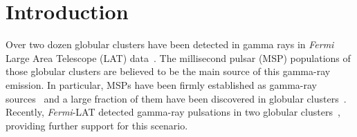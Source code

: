 \documentclass[doublespace,nopageskip]{VTthesis}
\begin{document}

\section{Introduction}\label{sec:intro}

Over two dozen globular clusters have been detected in gamma rays in {\it Fermi} Large Area Telescope (LAT) data~\citep{2009Sci...325..845A,2010A&A...524A..75A,2010ApJ...712L..36K,2011ApJ...729...90T,2015MNRAS.448.3215Z,2016MNRAS.459...99Z}. The millisecond pulsar (MSP) populations of those globular clusters are believed to be the main source of this gamma-ray emission. In particular, MSPs have been firmly established as gamma-ray sources~\citep{1996A&A...311L...9V,2009ApJ...699.1171A,2013MNRAS.430..571E,2013ApJS..208...17A} and a large fraction of them have been discovered in globular clusters~\citep{2005ASPC..328..147C}. Recently, \textit{Fermi}-LAT detected gamma-ray pulsations in two globular clusters~\citep{2011Sci...334.1107F,2013ApJ...778..106J}, providing further support for this scenario.
\end{document}
